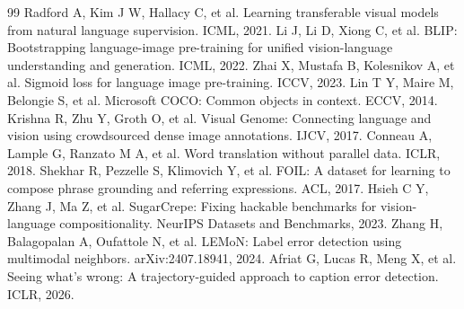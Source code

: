\documentclass[10pt,twocolumn,a4paper]{ctexart}
\begin{document}
\begin{thebibliography}{99}
\small
{} Radford A, Kim J W, Hallacy C, et al. Learning transferable visual models from natural language supervision. ICML, 2021.
 Li J, Li D, Xiong C, et al. BLIP: Bootstrapping language-image pre-training for unified vision-language understanding and generation. ICML, 2022.
 Zhai X, Mustafa B, Kolesnikov A, et al. Sigmoid loss for language image pre-training. ICCV, 2023.
 Lin T Y, Maire M, Belongie S, et al. Microsoft COCO: Common objects in context. ECCV, 2014.
 Krishna R, Zhu Y, Groth O, et al. Visual Genome: Connecting language and vision using crowdsourced dense image annotations. IJCV, 2017.
 Conneau A, Lample G, Ranzato M A, et al. Word translation without parallel data. ICLR, 2018.
 Shekhar R, Pezzelle S, Klimovich Y, et al. FOIL: A dataset for learning to compose phrase grounding and referring expressions. ACL, 2017.
 Hsieh C Y, Zhang J, Ma Z, et al. SugarCrepe: Fixing hackable benchmarks for vision-language compositionality. NeurIPS Datasets and Benchmarks, 2023.
 Zhang H, Balagopalan A, Oufattole N, et al. LEMoN: Label error detection using multimodal neighbors. arXiv:2407.18941, 2024.
 Afriat G, Lucas R, Meng X, et al. Seeing what's wrong: A trajectory-guided approach to caption error detection. ICLR, 2026.
\end{thebibliography}
\end{document}
